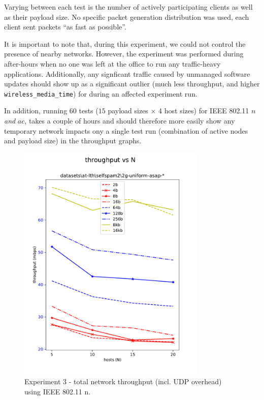 Varying between each test is the number of actively participating clients as
well as their payload size. No specific packet generation distribution was
used, each client sent packets ``as fast as possible''.

It is important to note that, during this experiment, we could not control the
presence of nearby networks. However, the experiment was performed during
after-hours when no one was left at the office to run any traffic-heavy
applications. Additionally, any signficant traffic caused by unmanaged
software updates should show up as a significant outlier (much less
throughput, and higher \texttt{wireless\_media\_time}) for during an affected
experiment run.

In addition, running 60 tests ($15$ payload sizes $\times$ 4 host sizes) for
IEEE 802.11 $n$ \emph{and} $ac$, takes a couple of hours and should therefore
more easily show any temporary network impacts ony a single test run
(combination of active nodes and payload size) in the throughput graphs.

\begin{figure}[tbp]
  \centering
  \includegraphics[width=0.8\textwidth]{images/exp3_tput.pdf}
  \caption{Experiment 3 - total network throughput (incl. UDP overhead) using IEEE 802.11 n.}
  \label{fig:exp3throughput}
\end{figure}

